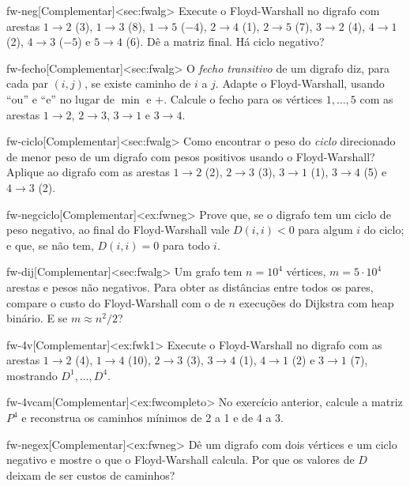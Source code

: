 \excompl
\begin{exercicio}{fw-neg}[Complementar]<sec:fwalg>
Execute o Floyd-Warshall no digrafo com arestas $1\to2$ (3), $1\to3$ (8), $1\to5$ ($-4$), $2\to4$ (1), $2\to5$ (7), $3\to2$ (4), $4\to1$ (2), $4\to3$ ($-5$) e $5\to4$ (6). Dê a matriz final. Há ciclo negativo?
\end{exercicio}
\begin{exercicio}{fw-fecho}[Complementar]<sec:fwalg>
O \emph{fecho transitivo} de um digrafo diz, para cada par $(i,j)$, se existe caminho de $i$ a $j$. Adapte o Floyd-Warshall, usando ``ou'' e ``e'' no lugar de $\min$ e $+$. Calcule o fecho para os vértices $1,\dots,5$ com as arestas $1\to2$, $2\to3$, $3\to1$ e $3\to4$.
\end{exercicio}
\begin{exercicio}{fw-ciclo}[Complementar]<sec:fwalg>
Como encontrar o peso do \emph{ciclo} direcionado de menor peso de um digrafo com pesos positivos usando o Floyd-Warshall? Aplique ao digrafo com as arestas $1\to2$ (2), $2\to3$ (3), $3\to1$ (1), $3\to4$ (5) e $4\to3$ (2).
\end{exercicio}
\begin{exercicio}{fw-negciclo}[Complementar]<ex:fwneg>
Prove que, se o digrafo tem um ciclo de peso negativo, ao final do Floyd-Warshall vale $D(i,i)<0$ para algum $i$ do ciclo; e que, se não tem, $D(i,i)=0$ para todo $i$.
\end{exercicio}
\begin{exercicio}{fw-dij}[Complementar]<sec:fwalg>
Um grafo tem $n=10^4$ vértices, $m=5\cdot10^4$ arestas e pesos não negativos. Para obter as distâncias entre todos os pares, compare o custo do Floyd-Warshall com o de $n$ execuções do Dijkstra com heap binário. E se $m\approx n^2/2$?
\end{exercicio}
\begin{exercicio}{fw-4v}[Complementar]<ex:fwk1>
Execute o Floyd-Warshall no digrafo com as arestas $1\to2$ (4), $1\to4$ (10), $2\to3$ (3), $3\to4$ (1), $4\to1$ (2) e $3\to1$ (7), mostrando $D^1,\dots,D^4$.
\end{exercicio}
\begin{exercicio}{fw-4vcam}[Complementar]<ex:fwcompleto>
No exercício anterior, calcule a matriz $P^4$ e reconstrua os caminhos mínimos de 2 a 1 e de 4 a 3.
\end{exercicio}
\begin{exercicio}{fw-negex}[Complementar]<ex:fwneg>
Dê um digrafo com dois vértices e um ciclo negativo e mostre o que o Floyd-Warshall calcula. Por que os valores de $D$ deixam de ser custos de caminhos?
\end{exercicio}
